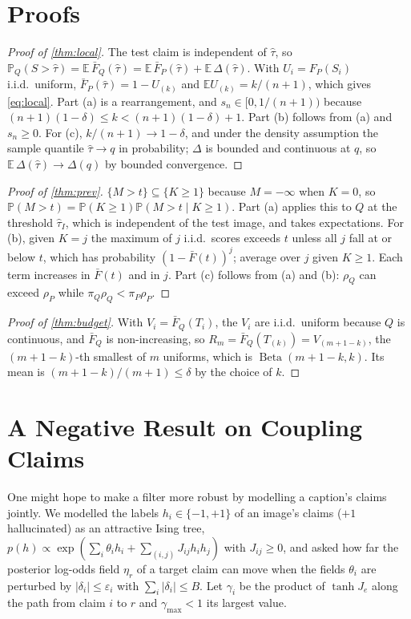 \documentclass[journal]{IEEEtran}
\theoremstyle{remark}\newtheorem{remark}{Remark}
\DeclareMathOperator{\Beta}{Beta}
\newcommand{\Sbar}{\bar F}
\renewcommand{\Pr}{\mathbb{P}}
\newcommand{\E}{\mathbb{E}}
\begin{document}
\section{Proofs}\label{app:proofs}
\begin{proof}[Proof of \cref{thm:local}]
The test claim is independent of $\hat\tau$, so $\Pr_Q(S>\hat\tau)=\E\,\Sbar_Q(\hat\tau)=\E\,\Sbar_P(\hat\tau)+\E\,\Delta(\hat\tau)$. With $U_i=F_P(S_i)$ i.i.d.\ uniform, $\Sbar_P(\hat\tau)=1-U_{(k)}$ and $\E U_{(k)}=k/(n+1)$, which gives \eqref{eq:local}. Part (a) is a rearrangement, and $s_n\in[0,1/(n+1))$ because $(n+1)(1-\delta)\le k<(n+1)(1-\delta)+1$. Part (b) follows from (a) and $s_n\ge0$. For (c), $k/(n+1)\to1-\delta$, and under the density assumption the sample quantile $\hat\tau\to q$ in probability; $\Delta$ is bounded and continuous at $q$, so $\E\,\Delta(\hat\tau)\to\Delta(q)$ by bounded convergence.
\end{proof}
\begin{proof}[Proof of \cref{thm:prev}]
$\{M>t\}\subseteq\{K\ge1\}$ because $M=-\infty$ when $K=0$, so $\Pr(M>t)=\Pr(K\ge1)\Pr(M>t\mid K\ge1)$. Part (a) applies this to $Q$ at the threshold $\hat\tau_I$, which is independent of the test image, and takes expectations. For (b), given $K=j$ the maximum of $j$ i.i.d.\ scores exceeds $t$ unless all $j$ fall at or below $t$, which has probability $(1-\Sbar(t))^j$; average over $j$ given $K\ge1$. Each term increases in $\Sbar(t)$ and in $j$. Part (c) follows from (a) and (b): $\rho_Q$ can exceed $\rho_P$ while $\pi_Q\rho_Q<\pi_P\rho_P$.
\end{proof}
\begin{proof}[Proof of \cref{thm:budget}]
With $V_i=\Sbar_Q(T_i)$, the $V_i$ are i.i.d.\ uniform because $Q$ is continuous, and $\Sbar_Q$ is non-increasing, so $R_m=\Sbar_Q(T_{(k)})=V_{(m+1-k)}$, the $(m+1-k)$-th smallest of $m$ uniforms, which is $\Beta(m+1-k,k)$. Its mean is $(m+1-k)/(m+1)\le\delta$ by the choice of $k$.
\end{proof}

\section{A Negative Result on Coupling Claims}\label{app:ising}
One might hope to make a filter more robust by modelling a caption's claims jointly. We modelled the labels $h_i\in\{-1,+1\}$ of an image's claims ($+1$ hallucinated) as an attractive Ising tree, $p(h)\propto\exp(\sum_i\theta_ih_i+\sum_{(i,j)}J_{ij}h_ih_j)$ with $J_{ij}\ge0$, and asked how far the posterior log-odds field $\eta_r$ of a target claim can move when the fields $\theta_i$ are perturbed by $|\delta_i|\le\varepsilon_i$ with $\sum_i|\delta_i|\le B$. Let $\gamma_i$ be the product of $\tanh J_e$ along the path from claim $i$ to $r$ and $\gamma_{\max}<1$ its largest value.
\end{document}
